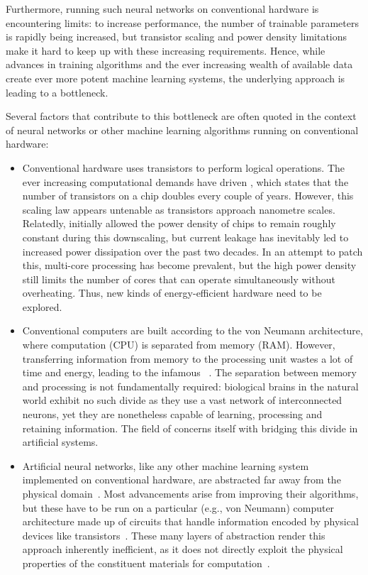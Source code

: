 Furthermore, running such neural networks on conventional hardware is encountering limits: to increase performance, the number of trainable parameters is rapidly being increased, but transistor scaling and power density limitations make it hard to keep up with these increasing requirements. %
Hence, while advances in training algorithms and the ever increasing wealth of available data create ever more potent machine learning systems, the underlying approach is leading to a bottleneck. \par
Several factors that contribute to this bottleneck are often quoted in the context of neural networks or other machine learning algorithms running on conventional hardware:
\begin{itemize} %
	\item Conventional hardware uses transistors to perform logical operations.
	The ever increasing computational demands have driven , which states that the number of transistors on a chip doubles every couple of years.
	However, this scaling law appears untenable as transistors approach nanometre scales.
	Relatedly,  initially allowed the power density of chips to remain roughly constant during this downscaling, but current leakage has inevitably led to increased power dissipation over the past two decades.
	In an attempt to patch this, multi-core processing has become prevalent, but the high power density still limits the number of cores that can operate simultaneously without overheating. %
	Thus, new kinds of energy-efficient hardware need to be explored.
	\item Conventional computers are built according to the von Neumann architecture, where computation (CPU) is separated from memory (RAM).
	However, transferring information from memory to the processing unit wastes a lot of time and energy, leading to the infamous ~\cite{TaskAdaptivePRC}.
	The separation between memory and processing is not fundamentally required: biological brains in the natural world exhibit no such divide as they use a vast network of interconnected neurons, yet they are nonetheless capable of learning, processing and retaining information.
	The field of  concerns itself with bridging this divide in artificial systems.
	\item Artificial neural networks, like any other machine learning system implemented on conventional hardware, are abstracted far away from the physical domain~\cite{RC_ASI}.
	Most advancements arise from improving their algorithms, but these have to be run on a particular (e.g., von Neumann) computer architecture made up of circuits that handle information encoded by physical devices like transistors~\cite{RC_SuperconductingElectronics}.
	These many layers of abstraction render this approach inherently inefficient, as it does not directly exploit the physical properties of the constituent materials for computation~\cite{RC_ASI}.
\end{itemize}
